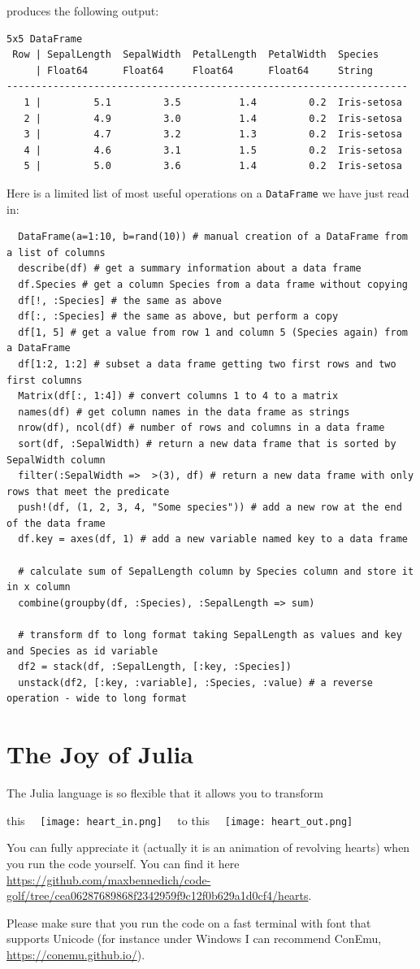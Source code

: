 \documentclass[10pt,a4paper]{article}
\begin{document}
produces the following output:
\begin{lstlisting}
5x5 DataFrame
 Row | SepalLength  SepalWidth  PetalLength  PetalWidth  Species
     | Float64      Float64     Float64      Float64     String
---------------------------------------------------------------------
   1 |         5.1         3.5          1.4         0.2  Iris-setosa
   2 |         4.9         3.0          1.4         0.2  Iris-setosa
   3 |         4.7         3.2          1.3         0.2  Iris-setosa
   4 |         4.6         3.1          1.5         0.2  Iris-setosa
   5 |         5.0         3.6          1.4         0.2  Iris-setosa
\end{lstlisting}

Here is a limited list of most useful operations on a \lstinline|DataFrame| we have just read in:
\begin{lstlisting}
  DataFrame(a=1:10, b=rand(10)) # manual creation of a DataFrame from a list of columns
  describe(df) # get a summary information about a data frame
  df.Species # get a column Species from a data frame without copying
  df[!, :Species] # the same as above
  df[:, :Species] # the same as above, but perform a copy
  df[1, 5] # get a value from row 1 and column 5 (Species again) from a DataFrame
  df[1:2, 1:2] # subset a data frame getting two first rows and two first columns
  Matrix(df[:, 1:4]) # convert columns 1 to 4 to a matrix
  names(df) # get column names in the data frame as strings
  nrow(df), ncol(df) # number of rows and columns in a data frame
  sort(df, :SepalWidth) # return a new data frame that is sorted by SepalWidth column
  filter(:SepalWidth =>  >(3), df) # return a new data frame with only rows that meet the predicate
  push!(df, (1, 2, 3, 4, "Some species")) # add a new row at the end of the data frame
  df.key = axes(df, 1) # add a new variable named key to a data frame

  # calculate sum of SepalLength column by Species column and store it in x column
  combine(groupby(df, :Species), :SepalLength => sum)

  # transform df to long format taking SepalLength as values and key and Species as id variable
  df2 = stack(df, :SepalLength, [:key, :Species])
  unstack(df2, [:key, :variable], :Species, :value) # a reverse operation - wide to long format
\end{lstlisting}

\section{The Joy of Julia}

The Julia language is so flexible that it allows you to transform

this$\quad$
\texttt{[image: heart\_in.png]}
$\quad$to this$\quad$
\texttt{[image: heart\_out.png]}

You can fully appreciate it (actually it is an animation of revolving hearts) when you run the code yourself. You can find it here
\url{https://github.com/maxbennedich/code-golf/tree/cea06287689868f2342959f9c12f0b629a1d0cf4/hearts}.

Please make sure that you run the code on a fast terminal with font that supports Unicode (for instance under Windows I can recommend ConEmu, \url{https://conemu.github.io/}).
\end{document}
